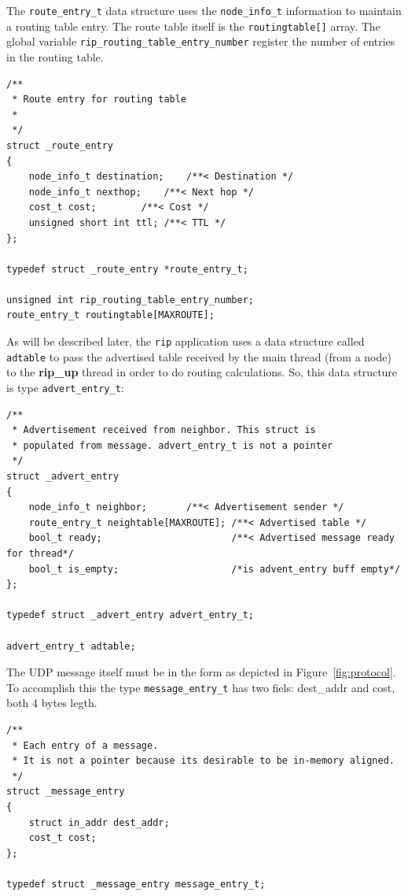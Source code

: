 \documentclass[10pt]{extarticle}
\begin{document}
The \texttt{route\_entry\_t} data structure uses the \texttt{node\_info\_t}
information to maintain a routing table entry. The route table itself is the
\texttt{routingtable[]} array. The global variable
\texttt{rip\_routing\_table\_entry\_number} register the number of entries in the
routing table.

\begin{lstlisting}
/**
 * Route entry for routing table
 * 
 */
struct _route_entry
{
    node_info_t destination;	/**< Destination */
    node_info_t nexthop;	/**< Next hop */
    cost_t cost;		/**< Cost */
    unsigned short int ttl;	/**< TTL */
};

typedef struct _route_entry *route_entry_t;

unsigned int rip_routing_table_entry_number;
route_entry_t routingtable[MAXROUTE];
\end{lstlisting}

As will be described later, the \texttt{rip} application uses a data structure
called \texttt{adtable} to pass the advertised table received by the main thread
(from a node) to the \textbf{rip\_up} thread in order to do routing
calculations. So, this data structure is type \texttt{advert\_entry\_t}:

\begin{lstlisting}
/**
 * Advertisement received from neighbor. This struct is 
 * populated from message. advert_entry_t is not a pointer
 */
struct _advert_entry
{
    node_info_t neighbor;		/**< Advertisement sender */
    route_entry_t neightable[MAXROUTE]; /**< Advertised table */
    bool_t ready;                       /**< Advertised message ready for thread*/
    bool_t is_empty;                    /*is advent_entry buff empty*/
};

typedef struct _advert_entry advert_entry_t;

advert_entry_t adtable;
\end{lstlisting}

The UDP message itself must be in the form as depicted in
Figure~\ref{fig:protocol}. To accomplish this the type
\texttt{message\_entry\_t} has two fiels: dest\_addr and cost, both 4 bytes legth.

\begin{lstlisting}
/**
 * Each entry of a message. 
 * It is not a pointer because its desirable to be in-memory aligned.
 */
struct _message_entry 
{
    struct in_addr dest_addr;
    cost_t cost;
};

typedef struct _message_entry message_entry_t;
\end{lstlisting}
\end{document}
